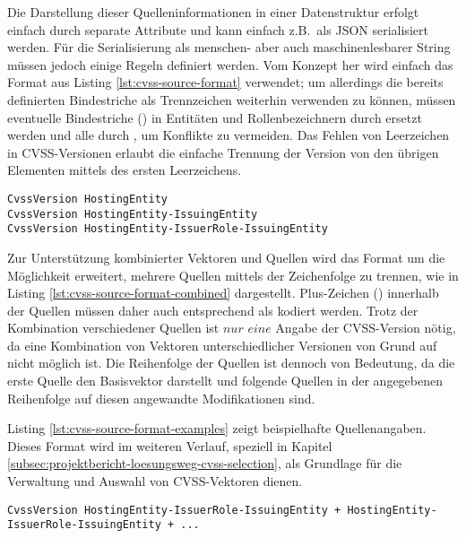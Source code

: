Die Darstellung dieser Quelleninformationen in einer Datenstruktur erfolgt einfach durch separate Attribute und kann einfach z.B.\ als JSON serialisiert werden.
Für die Serialisierung als menschen- aber auch maschinenlesbarer String müssen jedoch einige Regeln definiert werden.
Vom Konzept her wird einfach das Format aus Listing \ref{lst:cvss-source-format} verwendet; um allerdings die bereits definierten Bindestriche als Trennzeichen weiterhin verwenden zu können, müssen eventuelle Bindestriche (\qt{-}) in Entitäten und Rollenbezeichnern durch \qt{\textbackslash-} ersetzt werden und alle \qt{\textbackslash} durch \qt{\textbackslash\textbackslash}, um Konflikte zu vermeiden.
Das Fehlen von Leerzeichen in CVSS-Versionen erlaubt die einfache Trennung der Version von den übrigen Elementen mittels des ersten Leerzeichens.

\begin{lstlisting}[language={}, label={lst:cvss-source-format}, caption={Alternative CVSS-Quellen Formatdefinitionen}]
CvssVersion HostingEntity
CvssVersion HostingEntity-IssuingEntity
CvssVersion HostingEntity-IssuerRole-IssuingEntity
\end{lstlisting}

Zur Unterstützung kombinierter Vektoren und Quellen wird das Format um die Möglichkeit erweitert, mehrere Quellen mittels der Zeichenfolge \qt{ + } zu trennen, wie in Listing \ref{lst:cvss-source-format-combined} dargestellt.
Plus-Zeichen (\qt{+}) innerhalb der Quellen müssen daher auch entsprechend als \qt{\textbackslash+} kodiert werden.
Trotz der Kombination verschiedener Quellen ist $nur$ $eine$ Angabe der CVSS-Version nötig, da eine Kombination von Vektoren unterschiedlicher Versionen von Grund auf nicht möglich ist.
Die Reihenfolge der Quellen ist dennoch von Bedeutung, da die erste Quelle den Basisvektor darstellt und folgende Quellen in der angegebenen Reihenfolge auf diesen angewandte Modifikationen sind.

Listing \ref{lst:cvss-source-format-examples} zeigt beispielhafte Quellenangaben.
Dieses Format wird im weiteren Verlauf, speziell in Kapitel \ref{subsec:projektbericht-loesungsweg-cvss-selection}, als Grundlage für die Verwaltung und Auswahl von CVSS-Vektoren dienen.

\begin{lstlisting}[language={}, label={lst:cvss-source-format-combined}, caption={CVSS-Quellen Format \(Kombiniert\)}]
CvssVersion HostingEntity-IssuerRole-IssuingEntity + HostingEntity-IssuerRole-IssuingEntity + ...
\end{lstlisting}

